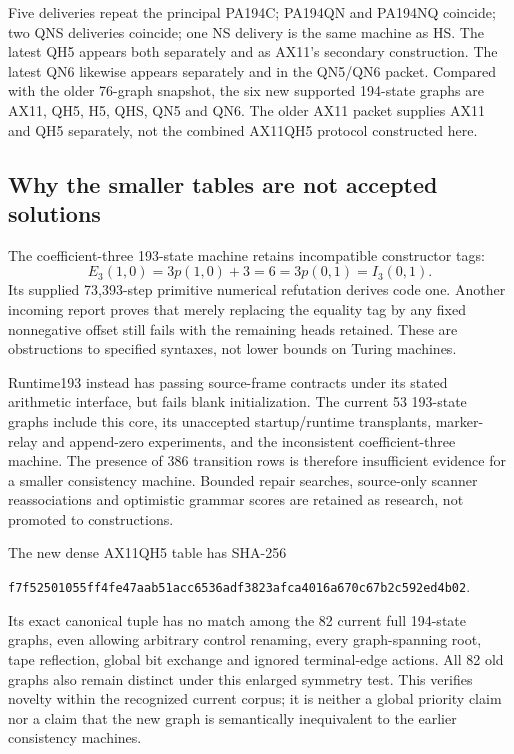 Five deliveries repeat the principal PA194C; PA194QN and PA194NQ coincide;
two QNS deliveries coincide; one NS delivery is the same machine as HS.
The latest QH5 appears both separately and as AX11's secondary construction.
The latest QN6 likewise appears separately and in the QN5/QN6 packet.
Compared with the older 76-graph snapshot, the six new supported 194-state
graphs are AX11, QH5, H5, QHS, QN5 and QN6. The older AX11 packet supplies
AX11 and QH5 separately, not the combined AX11QH5 protocol constructed here.

\subsection{Why the smaller tables are not accepted solutions}

The coefficient-three 193-state machine retains incompatible constructor
tags:
\[
 E_3(1,0)=3p(1,0)+3=6=3p(0,1)=I_3(0,1).
\]
Its supplied 73,393-step primitive numerical refutation derives code one.
Another incoming report proves that merely replacing the equality tag by
any fixed nonnegative offset still fails with the remaining heads retained.
These are obstructions to specified syntaxes, not lower bounds on Turing
machines.

Runtime193 instead has passing source-frame contracts under its stated
arithmetic interface, but fails blank initialization. The current 53
193-state graphs include this core, its unaccepted startup/runtime
transplants, marker-relay and append-zero experiments, and the inconsistent
coefficient-three machine. The presence of 386 transition rows is therefore
insufficient evidence for a smaller consistency machine. Bounded repair
searches, source-only scanner reassociations and optimistic grammar scores
are retained as research, not promoted to constructions.

The new dense AX11QH5 table has SHA-256
\begin{center}\small
\nolinkurl{f7f52501055ff4fe47aab51acc6536adf3823afca4016a670c67b2c592ed4b02}.
\end{center}
Its exact canonical tuple has no match among the 82 current full 194-state
graphs, even allowing arbitrary control renaming, every graph-spanning root,
tape reflection, global bit exchange and ignored terminal-edge actions.
All 82 old graphs also remain distinct under this enlarged symmetry test.
This verifies novelty within the recognized current corpus; it is neither
a global priority claim nor a claim that the new graph is semantically
inequivalent to the earlier consistency machines.
